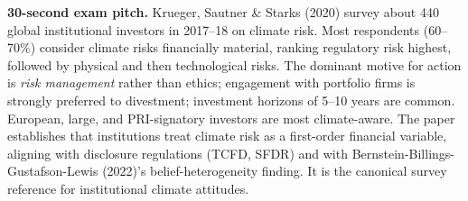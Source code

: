 \documentclass[11pt]{article}
\begin{document}
\begin{keybox}
\textbf{30-second exam pitch.} Krueger, Sautner \& Starks (2020) survey about 440 global institutional investors in 2017--18 on climate risk. Most respondents (60--70\%) consider climate risks financially material, ranking regulatory risk highest, followed by physical and then technological risks. The dominant motive for action is \emph{risk management} rather than ethics; engagement with portfolio firms is strongly preferred to divestment; investment horizons of 5--10 years are common. European, large, and PRI-signatory investors are most climate-aware. The paper establishes that institutions treat climate risk as a first-order financial variable, aligning with disclosure regulations (TCFD, SFDR) and with Bernstein-Billings-Gustafson-Lewis (2022)'s belief-heterogeneity finding. It is the canonical survey reference for institutional climate attitudes.
\end{keybox}
\end{document}
